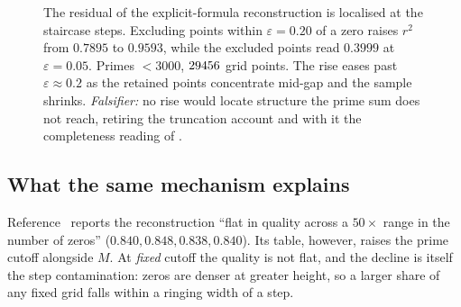 \documentclass[11pt]{article}
\theoremstyle{remark}
\begin{document}
\begin{figure}[ht]\centering
{}
\caption{The residual of the explicit-formula reconstruction is localised at the
staircase steps. Excluding points within $\varepsilon=0.20$ of a zero raises $r^2$ from
$0.7895$ to $0.9593$, while the excluded points read $0.3999$ at $\varepsilon=0.05$.
Primes ${<}3000$, $29456$ grid points. The rise eases past $\varepsilon\approx0.2$ as
the retained points concentrate mid-gap and the sample shrinks. \emph{Falsifier:} no
rise would locate structure the prime sum does not reach, retiring the truncation
account and with it the completeness reading of \cite{threelayer}.}
\label{fig:gibbs}
\end{figure}

\subsection{What the same mechanism explains}\label{sec:scaletest}

Reference~\cite{threelayer} reports the reconstruction ``flat in quality across a
$50\times$ range in the number of zeros'' ($0.840,0.848,0.838,0.840$). Its table,
however, raises the prime cutoff alongside $M$. At \emph{fixed} cutoff the quality is
not flat, and the decline is itself the step contamination: zeros are denser at greater
height, so a larger share of any fixed grid falls within a ringing width of a step.
\end{document}
